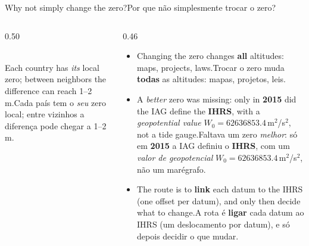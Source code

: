 \documentclass[aspectratio=169,11pt]{beamer}
\newcommand{\tr}[2]{\ifEN#2\else#1\fi}
\newcommand{\bnum}[1]{\ifmmode\textcolor{mTeal}{\mathbf{#1}}\else\textbf{\textcolor{mTeal}{#1}}\fi}
\begin{document}
\begin{frame}{\tr{Por que não simplesmente trocar o zero?}{Why not simply change the zero?}}
  \begin{columns}[T]
    \begin{column}{0.50\textwidth}
      \centering
      \\[1pt]
      {\scriptsize\tr{Cada país tem o \emph{seu} zero local; entre vizinhos a diferença pode chegar a 1--2\,m.}{Each country has \emph{its} local zero; between neighbors the difference can reach 1--2\,m.}}
    \end{column}
    \begin{column}{0.46\textwidth}
      \small
      \begin{itemize}
        \setlength{\itemsep}{3pt}
        \item \tr{Trocar o zero muda \bnum{todas} as altitudes: mapas, projetos, leis.}{Changing
              the zero changes \bnum{all} altitudes: maps, projects, laws.}
        \item \tr{Faltava um zero \emph{melhor}: só em \bnum{2015} a IAG definiu o \textbf{IHRS},
              com um \emph{valor de geopotencial} $W_0=\num{62636853.4}$\,m$^{2}$/s$^{2}$,
              não um marégrafo.}{A \emph{better} zero was missing: only in \bnum{2015} did the IAG
              define the \textbf{IHRS}, with a \emph{geopotential value}
              $W_0=\num{62636853.4}$\,m$^{2}$/s$^{2}$, not a tide gauge.}
        \item \tr{A rota é \bnum{ligar} cada datum ao IHRS (um deslocamento por datum), e só
              depois decidir o que mudar.}{The route is to \bnum{link} each datum to the IHRS (one
              offset per datum), and only then decide what to change.}
      \end{itemize}
    \end{column}
  \end{columns}
\end{frame}
\end{document}
